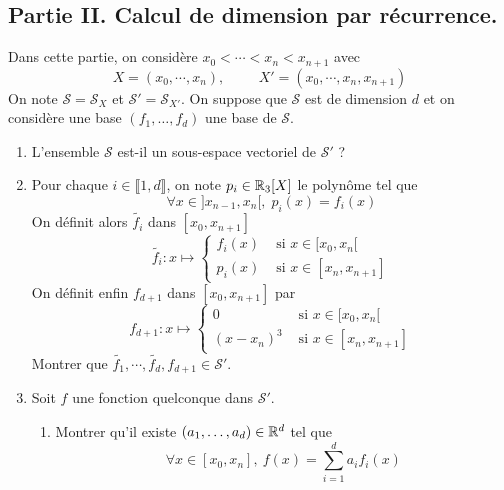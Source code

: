\subsection*{Partie II. Calcul de dimension par récurrence.}
Dans cette partie, on considère $x_0 < \cdots < x_n < x_{n+1}$ avec
\begin{displaymath}
   X = (x_0, \cdots , x_n), \hspace{1cm} X' = (x_0, \cdots , x_n , x_{n+1})
\end{displaymath}
On note $\mathcal{S}=\mathcal{S}_X$ et $\mathcal{S}'=\mathcal{S}_{X'}$.\newline
On suppose que $\mathcal{S}$ est de dimension $d$ et on considère une base $(f_1,\ldots,f_d)$ une base de $\mathcal{S}$.
\begin{enumerate}
\item L'ensemble $\mathcal{S}$ est-il un sous-espace vectoriel de $\mathcal{S}'$ ?

\item Pour chaque $i\in \llbracket 1,d\rrbracket$, on note $p_i \in \mathbb{R}_3[X]$ le polynôme tel que 
\begin{displaymath}
  \forall x \in ]x_{n-1},x_n[, \; p_i(x) = f_i(x)
\end{displaymath}
On définit alors $\widetilde{f_i}$ dans $[x_0,x_{n+1}]$
\begin{displaymath}
 \widetilde{f_i}  : x \mapsto 
\left\lbrace 
\begin{aligned}
  f_i(x) & \text{ si } x \in [x_0,x_n[ \\
  p_i(x) & \text{ si } x \in [x_n,x_{n+1}]
\end{aligned}
\right. 
\end{displaymath}
On définit enfin $f_{d+1}$ dans $[x_0,x_{n+1}]$ par 
\begin{displaymath}
f_{d+1} : x \mapsto 
\left\lbrace 
\begin{aligned}
  0 & \text{ si } x \in [x_0,x_n[ \\
  (x-x_n)^3 & \text{ si } x \in [x_n,x_{n+1}]
\end{aligned}
\right. 
\end{displaymath}
Montrer que $\widetilde{f_1}, \cdots, \widetilde{f_d}, f_{d+1} \in \mathcal{S}'$. 

\item  Soit $f$ une fonction quelconque dans $\mathcal{S}'$.
    \begin{enumerate}
    \item Montrer qu'il existe $(a_1,\ldots,a_d) \in \mathbb{R}^d$ tel que
\begin{displaymath}
  \forall x \in [x_0,x_n], \ f(x) = \sum\limits_{i=1}^{d} a_i f_i(x)
\end{displaymath}


\end{enumerate}
\end{enumerate}
